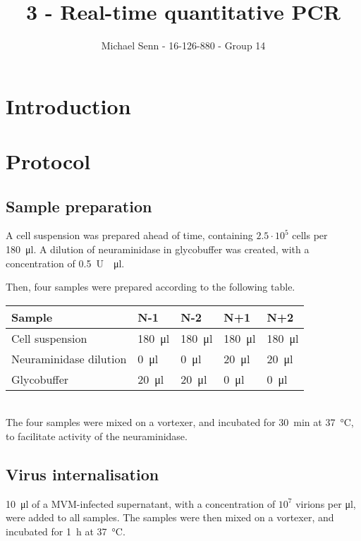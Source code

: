 \documentclass[a4paper,german]{scrreprt}
\title{3 - Real-time quantitative PCR}
\author{Michael Senn \maillink{michael.senn@students.unibe.ch} - 16-126-880 - Group 14}
\date{\printdate}
\begin{document}
\maketitle

\chapter{Introduction}

\chapter{Protocol}

\section{Sample preparation}

A cell suspension was prepared ahead of time, containing $2.5 \cdot 10^5$ cells
per \SI{180}{\ul}. A dilution of neuraminidase in glycobuffer was created, with
a concentration of \SI{0.5}{U \per \ul}.

Then, four samples were prepared according to the following table.
\\

\begin{tabu}{lllll}
	\toprule
	Sample & N-1 & N-2 & N+1 & N+2 \\
	\midrule
	Cell suspension & \SI{180}{\ul} & \SI{180}{\ul} & \SI{180}{\ul} & \SI{180}{\ul} \\
	Neuraminidase dilution & \SI{0}{\ul} & \SI{0}{\ul} & \SI{20}{\ul} & \SI{20}{\ul} \\
	Glycobuffer & \SI{20}{\ul} & \SI{20}{\ul} & \SI{0}{\ul} & \SI{0}{\ul} \\
	\bottomrule
\end{tabu}
\\

The four samples were mixed on a vortexer, and incubated for \SI{30}{\minute}
at \SI{37}{\celsius}, to facilitate activity of the neuraminidase.

\section{Virus internalisation}

\SI{10}{\ul} of a MVM-infected supernatant, with a concentration of $10^7$
virions per \si{\ul}, were added to all samples. The samples were then mixed on
a vortexer, and incubated for \SI{1}{\hour} at \SI{37}{\celsius}.
\end{document}
